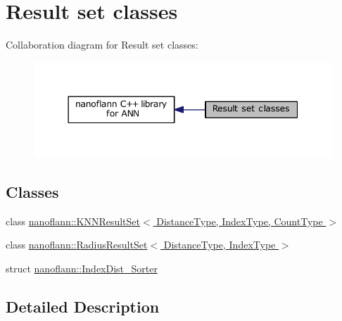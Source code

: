 \hypertarget{group__result__sets__grp}{\section{Result set classes}
\label{group__result__sets__grp}
}
Collaboration diagram for Result set classes\-:
\nopagebreak
\begin{figure}[H]
\begin{center}
\leavevmode
\includegraphics[width=344pt]{group__result__sets__grp}
\end{center}
\end{figure}
\subsection*{Classes}
\begin{DoxyCompactItemize}
\item 
class \hyperlink{classnanoflann_1_1_k_n_n_result_set}{nanoflann\-::\-K\-N\-N\-Result\-Set$<$ Distance\-Type, Index\-Type, Count\-Type $>$}
\item 
class \hyperlink{classnanoflann_1_1_radius_result_set}{nanoflann\-::\-Radius\-Result\-Set$<$ Distance\-Type, Index\-Type $>$}
\item 
struct \hyperlink{structnanoflann_1_1_index_dist___sorter}{nanoflann\-::\-Index\-Dist\-\_\-\-Sorter}
\end{DoxyCompactItemize}


\subsection{Detailed Description}
